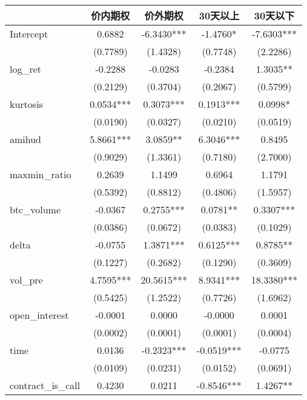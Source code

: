 \begin{tabular}{lcccc}
\hline
                   &    价内期权   &    价外期权    &   30天以上    &   30天以下     \\
\midrule
\midrule
Intercept          & 0.6882    & -6.3430*** & -1.4760*   & -7.6303***  \\
                   & (0.7789)  & (1.4328)   & (0.7748)   & (2.2286)    \\
log\_ret           & -0.2288   & -0.0283    & -0.2384    & 1.3035**    \\
                   & (0.2129)  & (0.3704)   & (0.2067)   & (0.5799)    \\
kurtosis           & 0.0534*** & 0.3073***  & 0.1913***  & 0.0998*     \\
                   & (0.0190)  & (0.0327)   & (0.0210)   & (0.0519)    \\
amihud             & 5.8661*** & 3.0859**   & 6.3046***  & 0.8495      \\
                   & (0.9029)  & (1.3361)   & (0.7180)   & (2.7000)    \\
maxmin\_ratio      & 0.2639    & 1.1499     & 0.6964     & 1.1791      \\
                   & (0.5392)  & (0.8812)   & (0.4806)   & (1.5957)    \\
btc\_volume        & -0.0367   & 0.2755***  & 0.0781**   & 0.3307***   \\
                   & (0.0386)  & (0.0672)   & (0.0383)   & (0.1029)    \\
delta              & -0.0755   & 1.3871***  & 0.6125***  & 0.8785**    \\
                   & (0.1227)  & (0.2682)   & (0.1290)   & (0.3609)    \\
vol\_pre           & 4.7595*** & 20.5615*** & 8.9341***  & 18.3380***  \\
                   & (0.5425)  & (1.2522)   & (0.7726)   & (1.6962)    \\
open\_interest     & -0.0001   & 0.0000     & -0.0000    & 0.0001      \\
                   & (0.0002)  & (0.0001)   & (0.0001)   & (0.0004)    \\
time               & 0.0136    & -0.2323*** & -0.0519*** & -0.0775     \\
                   & (0.0109)  & (0.0231)   & (0.0152)   & (0.0691)    \\
contract\_is\_call & 0.4230    & 0.0211     & -0.8546*** & 1.4267**    \\

\end{tabular}
